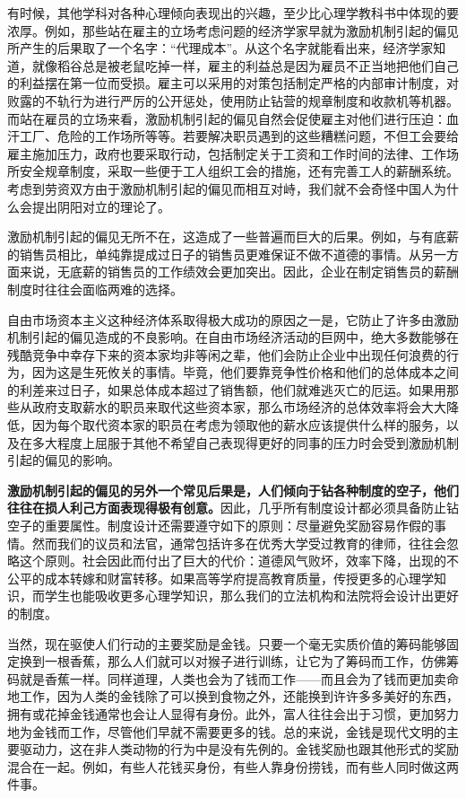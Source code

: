 有时候，其他学科对各种心理倾向表现出的兴趣，至少比心理学教科书中体现的要浓厚。例如，那些站在雇主的立场考虑问题的经济学家早就为激励机制引起的偏见所产生的后果取了一个名字：“代理成本”。从这个名字就能看出来，经济学家知道，就像稻谷总是被老鼠吃掉一样，雇主的利益总是因为雇员不正当地把他们自己的利益摆在第一位而受损。雇主可以采用的对策包括制定严格的内部审计制度，对败露的不轨行为进行严厉的公开惩处，使用防止钻营的规章制度和收款机等机器。而站在雇员的立场来看，激励机制引起的偏见自然会促使雇主对他们进行压迫：血汗工厂、危险的工作场所等等。若要解决职员遇到的这些糟糕问题，不但工会要给雇主施加压力，政府也要采取行动，包括制定关于工资和工作时间的法律、工作场所安全规章制度，采取一些便于工人组织工会的措施，还有完善工人的薪酬系统。考虑到劳资双方由于激励机制引起的偏见而相互对峙，我们就不会奇怪中国人为什么会提出阴阳对立的理论了。
\par

激励机制引起的偏见无所不在，这造成了一些普遍而巨大的后果。例如，与有底薪的销售员相比，单纯靠提成过日子的销售员更难保证不做不道德的事情。从另一方面来说，无底薪的销售员的工作绩效会更加突出。因此，企业在制定销售员的薪酬制度时往往会面临两难的选择。
\par

自由市场资本主义这种经济体系取得极大成功的原因之一是，它防止了许多由激励机制引起的偏见造成的不良影响。在自由市场经济活动的巨网中，绝大多数能够在残酷竞争中幸存下来的资本家均非等闲之辈，他们会防止企业中出现任何浪费的行为，因为这是生死攸关的事情。毕竟，他们要靠竞争性价格和他们的总体成本之间的利差来过日子，如果总体成本超过了销售额，他们就难逃灭亡的厄运。如果用那些从政府支取薪水的职员来取代这些资本家，那么市场经济的总体效率将会大大降低，因为每个取代资本家的职员在考虑为领取他的薪水应该提供什么样的服务，以及在多大程度上屈服于其他不希望自己表现得更好的同事的压力时会受到激励机制引起的偏见的影响。
\par

\textbf{激励机制引起的偏见的另外一个常见后果是，人们倾向于钻各种制度的空子，他们往往在损人利己方面表现得极有创意。}因此，几乎所有制度设计都必须具备防止钻空子的重要属性。制度设计还需要遵守如下的原则：尽量避免奖励容易作假的事情。然而我们的议员和法官，通常包括许多在优秀大学受过教育的律师，往往会忽略这个原则。社会因此而付出了巨大的代价：道德风气败坏，效率下降，出现的不公平的成本转嫁和财富转移。如果高等学府提高教育质量，传授更多的心理学知识，而学生也能吸收更多心理学知识，那么我们的立法机构和法院将会设计出更好的制度。
\par

当然，现在驱使人们行动的主要奖励是金钱。只要一个毫无实质价值的筹码能够固定换到一根香蕉，那么人们就可以对猴子进行训练，让它为了筹码而工作，仿佛筹码就是香蕉一样。同样道理，人类也会为了钱而工作——而且会为了钱而更加卖命地工作，因为人类的金钱除了可以换到食物之外，还能换到许许多多美好的东西，拥有或花掉金钱通常也会让人显得有身份。此外，富人往往会出于习惯，更加努力地为金钱而工作，尽管他们早就不需要更多的钱。总的来说，金钱是现代文明的主要驱动力，这在非人类动物的行为中是没有先例的。金钱奖励也跟其他形式的奖励混合在一起。例如，有些人花钱买身份，有些人靠身份捞钱，而有些人同时做这两件事。
\par

